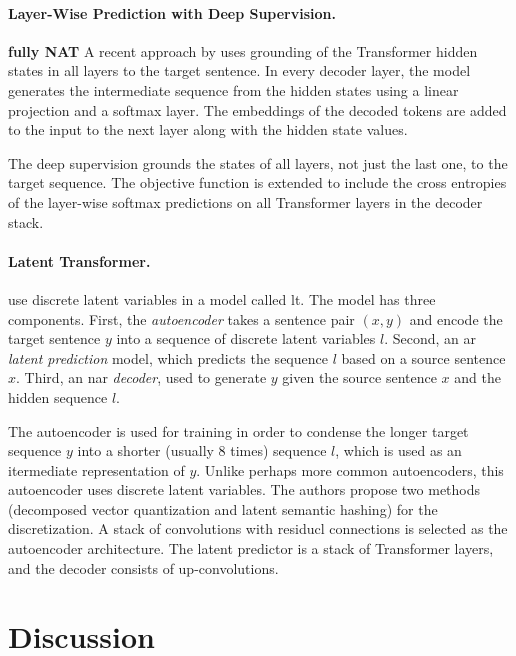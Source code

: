 \paragraph{Layer-Wise Prediction with Deep Supervision.}  \textbf{fully NAT}
 A recent
approach by \citet{huang-etal-2021-nonautoregressive} uses grounding of the
Transformer hidden states in all layers to the target sentence.  In every
decoder layer, the model generates the intermediate sequence from the hidden
states using a linear projection and a softmax layer. The embeddings of the
decoded tokens are added to the input to the next layer along with the hidden
state values.

The deep supervision grounds the states of all layers, not just the last one,
to the target sequence. The objective function is extended to include the cross
entropies of the layer-wise softmax predictions on all Transformer layers in
the decoder stack.


\paragraph{Latent Transformer.} \citet{kaiser2018fast} use discrete latent
variables in a model called \acf{lt}. The model has three
components. First, the \emph{autoencoder} takes a sentence pair $(x, y)$ and
encode the target sentence $y$ into a sequence of discrete latent variables
$l$. Second, an \acl{ar} \emph{latent prediction} model, which predicts the
sequence $l$ based on a source sentence $x$. Third, an \acs{nar}
\emph{decoder}, used to generate $y$ given the source sentence $x$ and the
hidden sequence $l$.

The autoencoder is used for training in order to condense the longer target
sequence $y$ into a shorter (usually 8 times) sequence $l$, which is used as an
itermediate representation of $y$. Unlike perhaps more common autoencoders,
this autoencoder uses discrete latent variables. The authors propose two
methods (decomposed vector quantization and latent semantic hashing) for the
discretization. A stack of convolutions with residucl connections is selected
as the autoencoder architecture. The latent predictor is a stack of Transformer
layers, and the decoder consists of up-convolutions.

\section{Discussion}%
\label{sec:nat:discussion}

